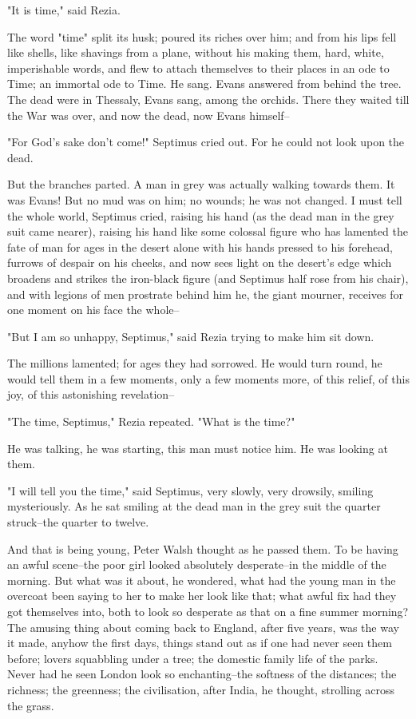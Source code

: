 \documentclass[lang=cn,10pt]{elegantbook}
\begin{document}
"It is time," said Rezia.

The word "time" split its husk; poured its riches over him; and
from his lips fell like shells, like shavings from a plane, without
his making them, hard, white, imperishable words, and flew to
attach themselves to their places in an ode to Time; an immortal
ode to Time.  He sang.  Evans answered from behind the tree.  The
dead were in Thessaly, Evans sang, among the orchids.  There they
waited till the War was over, and now the dead, now Evans himself--

"For God's sake don't come!" Septimus cried out.  For he could not
look upon the dead.

But the branches parted.  A man in grey was actually walking
towards them.  It was Evans!  But no mud was on him; no wounds; he
was not changed.  I must tell the whole world, Septimus cried,
raising his hand (as the dead man in the grey suit came nearer),
raising his hand like some colossal figure who has lamented the
fate of man for ages in the desert alone with his hands pressed to
his forehead, furrows of despair on his cheeks, and now sees light
on the desert's edge which broadens and strikes the iron-black
figure (and Septimus half rose from his chair), and with legions of
men prostrate behind him he, the giant mourner, receives for one
moment on his face the whole--

"But I am so unhappy, Septimus," said Rezia trying to make him sit
down.

The millions lamented; for ages they had sorrowed.  He would turn
round, he would tell them in a few moments, only a few moments
more, of this relief, of this joy, of this astonishing revelation--

"The time, Septimus," Rezia repeated.  "What is the time?"

He was talking, he was starting, this man must notice him.  He was
looking at them.

"I will tell you the time," said Septimus, very slowly, very
drowsily, smiling mysteriously.  As he sat smiling at the dead man
in the grey suit the quarter struck--the quarter to twelve.

And that is being young, Peter Walsh thought as he passed them.
To be having an awful scene--the poor girl looked absolutely
desperate--in the middle of the morning.  But what was it about, he
wondered, what had the young man in the overcoat been saying to her
to make her look like that; what awful fix had they got themselves
into, both to look so desperate as that on a fine summer morning?
The amusing thing about coming back to England, after five years,
was the way it made, anyhow the first days, things stand out as if
one had never seen them before; lovers squabbling under a tree; the
domestic family life of the parks.  Never had he seen London look
so enchanting--the softness of the distances; the richness; the
greenness; the civilisation, after India, he thought, strolling
across the grass.
\end{document}
